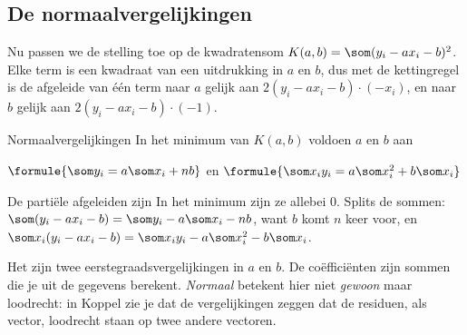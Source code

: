 \begin{oefeningen}
\end{oefeningen}

\subsection{De normaalvergelijkingen}

Nu passen we de stelling toe op de kwadratensom $K(a, b) = \som (y_i - a x_i - b)^2$. Elke term is een kwadraat van een uitdrukking in $a$ en $b$, dus met de kettingregel is de afgeleide van één term naar $a$ gelijk aan $2(y_i - a x_i - b) \cdot (-x_i)$, en naar $b$ gelijk aan $2(y_i - a x_i - b) \cdot (-1)$.

\begin{theorie}
\begin{stelling}{Normaalvergelijkingen}
In het minimum van $K(a, b)$ voldoen $a$ en $b$ aan

\vspace{1mm}
\qquad $\formule{\som y_i = a \som x_i + nb}$ \quad en \quad $\formule{\som x_i y_i = a \som x_i^2 + b \som x_i}$
\end{stelling}

\begin{bewijs}
De partiële afgeleiden zijn
In het minimum zijn ze allebei 0. Splits de sommen: $\som (y_i - a x_i - b) = \som y_i - a\som x_i - nb$, want $b$ komt $n$ keer voor, en $\som x_i(y_i - a x_i - b) = \som x_i y_i - a\som x_i^2 - b\som x_i$.
\end{bewijs}
\end{theorie}

Het zijn twee eerstegraadsvergelijkingen in $a$ en $b$. De coëfficiënten zijn sommen die je uit de gegevens berekent. \textit{Normaal} betekent hier niet \textit{gewoon} maar loodrecht: in Koppel zie je dat de vergelijkingen zeggen dat de residuen, als vector, loodrecht staan op twee andere vectoren.

